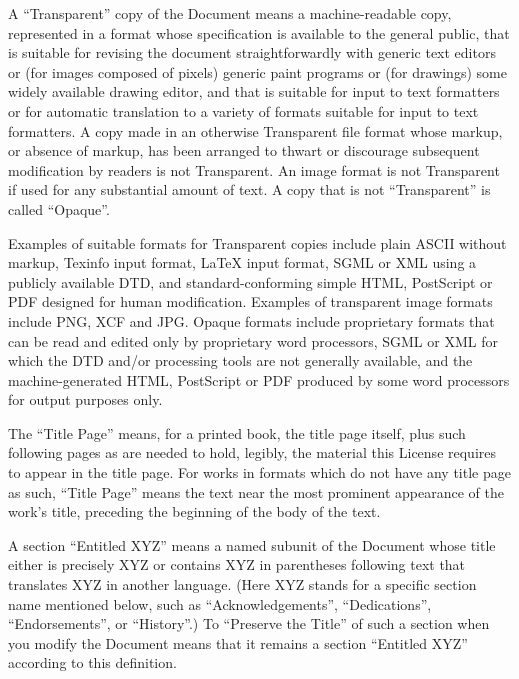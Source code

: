 {\tiny{}A “Transparent'' copy of the Document means a machine-readable
copy, represented in a format whose specification is available to
the general public, that is suitable for revising the document straightforwardly
with generic text editors or (for images composed of pixels) generic
paint programs or (for drawings) some widely available drawing editor,
and that is suitable for input to text formatters or for automatic
translation to a variety of formats suitable for input to text formatters.
A copy made in an otherwise Transparent file format whose markup,
or absence of markup, has been arranged to thwart or discourage subsequent
modification by readers is not Transparent. An image format is not
Transparent if used for any substantial amount of text. A copy that
is not “Transparent'' is called “Opaque''.}{\tiny\par}

{\tiny{}Examples of suitable formats for Transparent copies include
plain ASCII without markup, Texinfo input format, \LaTeX{} input format,
SGML or XML using a publicly available DTD, and standard-conforming
simple HTML, PostScript or PDF designed for human modification. Examples
of transparent image formats include PNG, XCF and JPG. Opaque formats
include proprietary formats that can be read and edited only by proprietary
word processors, SGML or XML for which the DTD and/or processing tools
are not generally available, and the machine-generated HTML, PostScript
or PDF produced by some word processors for output purposes only.}{\tiny\par}

{\tiny{}The ``Title Page'' means, for a printed book, the title
page itself, plus such following pages as are needed to hold, legibly,
the material this License requires to appear in the title page. For
works in formats which do not have any title page as such, “Title
Page” means the text near the most prominent appearance of the work's
title, preceding the beginning of the body of the text.}{\tiny\par}

{\tiny{}A section ``Entitled XYZ'' means a named subunit of the
Document whose title either is precisely XYZ or contains XYZ in parentheses
following text that translates XYZ in another language. (Here XYZ
stands for a specific section name mentioned below, such as “Acknowledgements”,
“Dedications”, “Endorsements”, or “History”.) To “Preserve the Title”
of such a section when you modify the Document means that it remains
a section “Entitled XYZ” according to this definition.}{\tiny\par}

